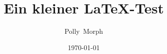 \documentclass{book}
\begin{document}
\title{Ein kleiner \LaTeX-Test}
\author{Polly~Morph}
\date{\today}

\maketitle

\tableofcontents



\end{document}
